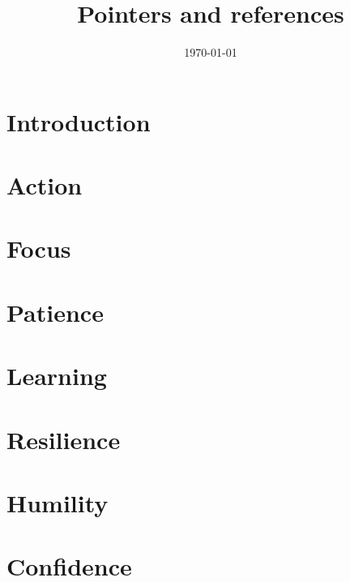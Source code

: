 \documentclass{book}
\title{Pointers and references}
\author{}
\date{\duration\today}
\begin{document}
\maketitle{}
\tableofcontents

\chapter{Introduction}


\cleartorightpage


\chapter{Action}


\chapter{Focus}


\chapter{Patience}


\chapter{Learning}


\chapter{Resilience}


\chapter{Humility}


\chapter{Confidence}

\end{document}
